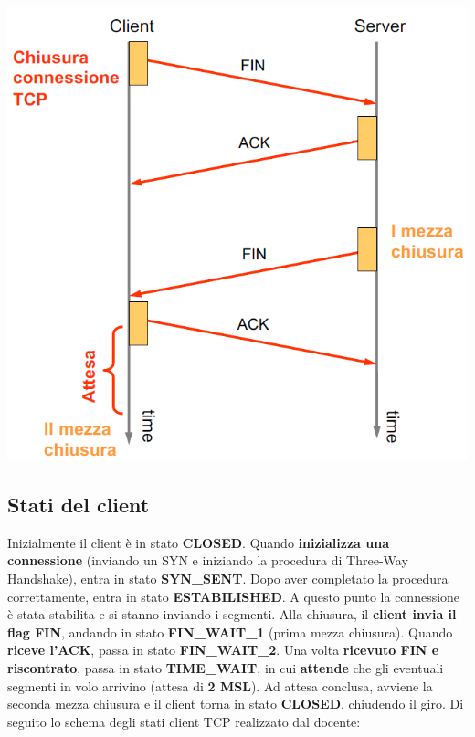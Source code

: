 \documentclass[12pt]{article}
\begin{document}
\begin{center}
    \includegraphics[scale=0.4]{tcp_release}
\end{center}

\subsection{Stati del client}

Inizialmente il client è in stato \textbf{CLOSED}. Quando \textbf{inizializza una connessione} (inviando un SYN e iniziando la procedura di Three-Way Handshake), entra in stato \textbf{SYN\_SENT}. Dopo aver completato la procedura correttamente, entra in stato \textbf{ESTABILISHED}. A questo punto la connessione è stata stabilita e si stanno inviando i segmenti. Alla chiusura, il \textbf{client invia il flag FIN}, andando in stato \textbf{FIN\_WAIT\_1} (prima mezza chiusura). Quando \textbf{riceve l'ACK}, passa in stato \textbf{FIN\_WAIT\_2}. Una volta \textbf{ricevuto FIN e riscontrato}, passa in stato \textbf{TIME\_WAIT}, in cui \textbf{attende} che gli eventuali segmenti in volo arrivino (attesa di \textbf{2 MSL}). Ad attesa conclusa, avviene la seconda mezza chiusura e il client torna in stato \textbf{CLOSED}, chiudendo il giro. Di seguito lo schema degli stati client TCP realizzato dal docente:
\end{document}
